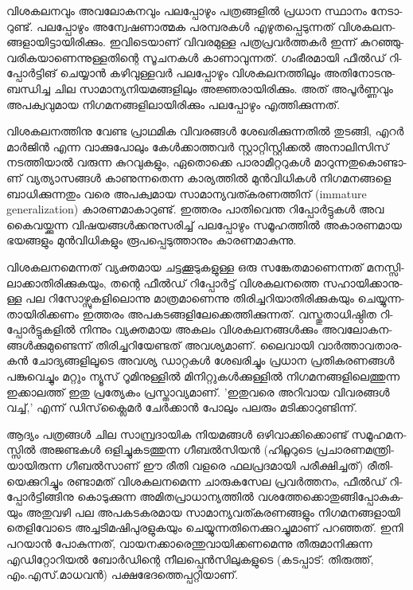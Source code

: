 ­വി­ശ­ക­ല­ന­വും അവ­ലോ­ക­ന­വും പല­പ്പോ­ഴും പത്ര­ങ്ങ­ളില്‍ പ്ര­ധാന സ്ഥാ­നം നേ­ടാ­റു­ണ്ട്. പല­പ്പോ­ഴും അന്വേ­ഷ­ണാ­ത്മക 
പര­മ്പ­ര­കള്‍ എഴു­ത­പ്പെ­ടു­ന്ന­ത് വി­ശ­ക­ല­ന­ങ്ങ­ളാ­യി­ട്ടാ­യി­രി­ക്കും. ഇവി­ടെ­യാ­ണ് വി­വ­ര­മു­ള്ള പത്ര­പ്ര­വര്‍­ത്ത­കര്‍ ഇന്ന് 
കു­റ­ഞ്ഞു­വ­രി­ക­യാ­ണെ­ന്നു­ള്ള­തി­ന്റെ സൂ­ച­ന­കള്‍ കാ­ണാ­വു­ന്ന­ത്. ഗം­ഭീ­ര­മാ­യി ഫീല്‍­ഡ് റി­പ്പോര്‍­ട്ടി­ങ് ചെ­യ്യാന്‍ 
കഴി­വു­ള്ള­വര്‍ പല­പ്പോ­ഴും വി­ശ­ക­ല­ന­ത്തി­ലും അതി­നോ­ട­നു­ബ­ന്ധി­ച്ച ചില സാ­മാ­ന്യ­നി­യ­മ­ങ്ങ­ളി­ലും അജ്ഞ­രാ­യി­രി­ക്കും. 
അത് അപൂര്‍­ണ്ണ­വും അപ­ക്വ­വു­മായ നി­ഗ­മ­ന­ങ്ങ­ളി­ലാ­യി­രി­ക്കും പല­പ്പോ­ഴും എത്തി­ക്കു­ന്ന­ത്.

­വി­ശ­ക­ല­ന­ത്തി­നു വേ­ണ്ട പ്രാ­ഥ­മിക വി­വ­ര­ങ്ങള്‍ ശേ­ഖ­രി­ക്കു­ന്ന­തില്‍ തു­ട­ങ്ങി, എറര്‍ മാര്‍­ജിന്‍ എന്ന വാ­ക്കു­പോ­ലും 
കേള്‍­ക്കാ­ത്ത­വര്‍ സ്റ്റാ­റ്റി­സ്റ്റി­ക്കല്‍ അനാ­ലി­സി­സ് നട­ത്തി­യാല്‍ വരു­ന്ന കു­റ­വു­ക­ളും, ഏതൊ­ക്കെ പാ­രാ­മീ­റ്റ­റു­കള്‍ 
മാ­റു­ന്ന­തു­കൊ­ണ്ടാ­ണ് വ്യ­ത്യാ­സ­ങ്ങള്‍ കാ­ണു­ന്ന­തെ­ന്ന കാ­ര്യ­ത്തില്‍ മുന്‍­വി­ധി­കള്‍ നി­ഗ­മ­ന­ങ്ങ­ളെ ബാ­ധി­ക്കു­ന്ന­തും വരെ 
അപ­ക്വ­മായ സാ­മാ­ന്യ­വ­ത്ക­ര­ണ­ത്തി­ന് (immature generalization) കാ­ര­ണ­മാ­കാ­റു­ണ്ട്. ഇത്ത­രം പാ­തി­വെ­ന്ത 
റി­പ്പോര്‍­ട്ടു­കള്‍ അവ കൈ­വ­യ്ക്കു­ന്ന വി­ഷ­യ­ങ്ങള്‍­ക്ക­നു­സ­രി­ച്ച് പല­പ്പോ­ഴും സമൂ­ഹ­ത്തില്‍ അകാ­ര­ണ­മായ ഭയ­ങ്ങ­ളും 
മുന്‍­വി­ധി­ക­ളും രൂ­പ­പ്പെ­ടു­ത്താ­നും കാ­ര­ണ­മാ­കു­ന്നു­.

­വി­ശ­ക­ല­ന­മെ­ന്ന­ത് വ്യ­ക്ത­മായ ചട്ട­ക്കൂ­ടു­ക­ളു­ള്ള ഒരു സങ്കേ­ത­മാ­ണെ­ന്ന­ത് മന­സ്സി­ലാ­ക്കാ­തി­രി­ക്കു­ക­യും, തന്റെ ഫീല്‍­ഡ് 
­റി­പ്പോര്‍­ട്ട് വി­ശ­ക­ല­ന­ത്തെ സഹാ­യി­ക്കാ­നു­ള്ള പല റി­സോ­ഴ്സു­ക­ളി­ലൊ­ന്നു മാ­ത്ര­മാ­ണെ­ന്നു തി­രി­ച്ച­റി­യാ­തി­രി­ക്കു­ക­യും 
ചെ­യ്യു­ന്ന­താ­യി­രി­ക്ക­ണം ഇത്ത­രം അപ­ക­ട­ങ്ങ­ളി­ലേ­ക്കെ­ത്തി­ക്കു­ന്ന­ത്. വസ്തു­താ­ധി­ഷ്ഠിത റി­പ്പോര്‍­ട്ടു­ക­ളില്‍ നി­ന്നും 
വ്യ­ക്ത­മായ അക­ലം വി­ശ­ക­ല­ന­ങ്ങള്‍­ക്കും അവ­ലോ­ക­ന­ങ്ങള്‍­ക്കു­മു­ണ്ടെ­ന്ന് തി­രി­ച്ച­റി­യേ­ണ്ട­ത് അവ­ശ്യ­മാ­ണ്. ലൈ­വാ­യി 
വാര്‍­ത്താ­വ­താ­ര­കന്‍ ചോ­ദ്യ­ങ്ങ­ളി­ലൂ­ടെ അവ­ശ്യ ഡാ­റ്റ­കള്‍ ശേ­ഖ­രി­ച്ചും പ്ര­ധാന പ്ര­തി­ക­ര­ണ­ങ്ങള്‍ പങ്കു­വെ­ച്ചും മറ്റും ന്യൂ­സ് 
റൂ­മി­നു­ള്ളില്‍ മി­നി­റ്റു­കള്‍­ക്കു­ള്ളില്‍ നി­ഗ­മ­ന­ങ്ങ­ളി­ലെ­ത്തു­ന്ന ഇക്കാ­ല­ത്ത് ഇതു പ്ര­ത്യേ­കം പ്ര­സ്താ­വ്യ­മാ­ണ്. 'ഇ­തു­വ­രെ അറി­വായ 
വി­വ­ര­ങ്ങള്‍ വച്ച്,' എന്ന് ഡി­സ്‌­ക്ലൈ­മര്‍ ചേര്‍­ക്കാന്‍ പോ­ലും പല­രും മടി­ക്കാ­റു­ണ്ടി­ന്ന്.‌

ആ­ദ്യം പത്ര­ങ്ങള്‍ ചില സാ­മ്പ്ര­ദാ­യിക നി­യ­മ­ങ്ങള്‍ ഒഴി­വാ­ക്കി­ക്കൊ­ണ്ട് സമൂ­ഹ­മ­ന­സ്സില്‍ അജ­ണ്ട­കള്‍ ഒളി­ച്ചു­ക­ട­ത്തു­ന്ന 
ഗീ­ബല്‍­സി­യന്‍ (ഹി­റ്റ്ല­റു­ടെ പ്ര­ചാ­ര­ണ­മ­ന്ത്രി­യാ­യി­രു­ന്ന ഗീ­ബല്‍­സാ­ണ് ഈ രീ­തി വള­രെ ഫല­പ്ര­ദ­മാ­യി പരീ­ക്ഷി­ച്ച­ത്) 
രീ­തി­യെ­ക്കു­റി­ച്ചും രണ്ടാ­മ­ത് വി­ശ­ക­ല­ന­മെ­ന്ന ചാ­രു­ക­സേല പ്ര­വര്‍­ത്ത­നം, ഫീല്‍­ഡ് റി­പ്പോര്‍­ട്ടി­ങ്ങി­നു കൊ­ടു­ക്കു­ന്ന 
അമി­ത­പ്രാ­ധാ­ന്യ­ത്തില്‍ വശ­ത്തേ­ക്കൊ­തു­ങ്ങി­പ്പോ­കു­ക­യും അതു­വ­ഴി പല അപ­ക­ട­ക­ര­മായ സാ­മാ­ന്യ­വ­ത്ക­ര­ണ­ങ്ങ­ളും 
നി­ഗ­മ­ന­ങ്ങ­ളാ­യി തെ­ളി­വോ­ടെ അച്ച­ടി­മ­ഷി­പു­ര­ളു­ക­യും ചെ­യ്യു­ന്ന­തി­നെ­ക്കു­റ­ച്ചു­മാ­ണ് പറ­ഞ്ഞ­ത്. ഇനി പറ­യാന്‍ പോ­കു­ന്ന­ത്, 
വാ­യ­ന­ക്കാ­രെ­ന്തു­വാ­യി­ക്ക­ണ­മെ­ന്നു തീ­രു­മാ­നി­ക്കു­ന്ന എഡി­റ്റോ­റി­യല്‍ ബോര്‍­ഡി­ന്റെ നീ­ല­പ്പെന്‍­സി­ലു­ക­ളു­ടെ 
(ക­ട­പ്പാ­ട്: തി­രു­ത്ത്, എം­.എ­സ്.­മാ­ധ­വന്‍) പക്ഷ­ഭേ­ദ­ത്തെ­പ്പ­റ്റി­യാ­ണ്.

